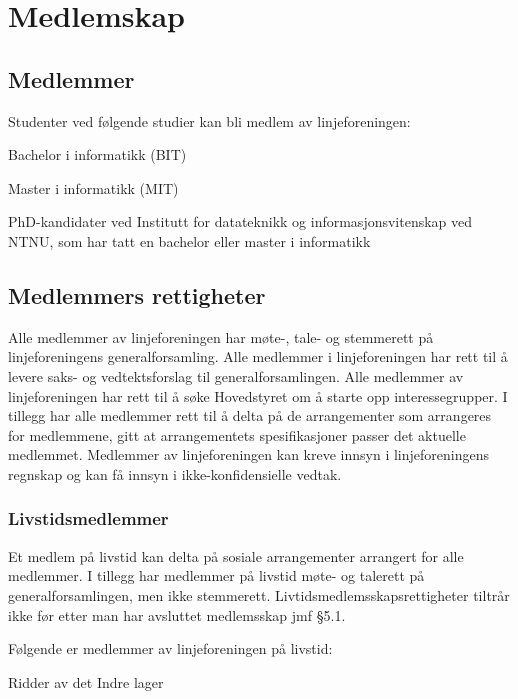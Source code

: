 \chapter{Medlemskap}

\section{Medlemmer}{
\label{chap:medlemskap}
Studenter ved følgende studier kan bli medlem av linjeforeningen: 
\begin{liste}
	\item Bachelor i informatikk (BIT)
	\item Master i informatikk (MIT)
    \item PhD-kandidater ved Institutt for datateknikk og informasjonsvitenskap ved NTNU, som har tatt en bachelor eller master i informatikk
\end{liste} 
}
\section{Medlemmers rettigheter\newline}{
Alle medlemmer av linjeforeningen har møte-, tale- og stemmerett på linjeforeningens generalforsamling. Alle medlemmer i linjeforeningen har rett til å levere saks- og vedtektsforslag til generalforsamlingen. Alle medlemmer av linjeforeningen har rett til å søke Hovedstyret om å starte opp interessegrupper. I tillegg har alle medlemmer rett til å delta på de arrangementer som arrangeres for medlemmene, gitt at arrangementets spesifikasjoner passer det aktuelle medlemmet. Medlemmer av linjeforeningen kan kreve innsyn i linjeforeningens regnskap og kan få innsyn i ikke-konfidensielle vedtak. 
}

\subsection{Livstidsmedlemmer}{
Et medlem på livstid kan delta på sosiale arrangementer arrangert for alle medlemmer. I tillegg har medlemmer på livstid møte- og talerett på generalforsamlingen, men ikke stemmerett. Livtidsmedlemsskapsrettigheter tiltrår ikke før etter man har avsluttet medlemsskap jmf §5.1.

Følgende er medlemmer av linjeforeningen på livstid:
\begin{liste}
	\item Ridder av det Indre lager
\end{liste}

}
